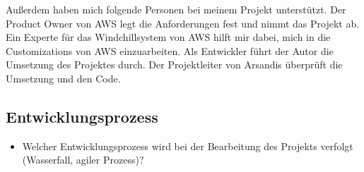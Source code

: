 Außerdem haben mich folgende Personen bei meinem Projekt unterstützt.
Der Product Owner von \acs{AWS} legt die Anforderungen fest und nimmt das Projekt ab.
Ein Experte für das Windchillsystem von \acs{AWS} hilft mir dabei, mich in die Customizations von \acs{AWS} einzuarbeiten.
Als Entwickler führt der Autor die Umsetzung des Projektes durch.
Der Projektleiter von Arsandis überprüft die Umsetzung und den Code.

\subsection{Entwicklungsprozess}
\label{sec:Entwicklungsprozess}
\begin{itemize}
	\item Welcher Entwicklungsprozess wird bei der Bearbeitung des Projekts verfolgt (\zB Wasserfall, agiler Prozess)?
\end{itemize}
